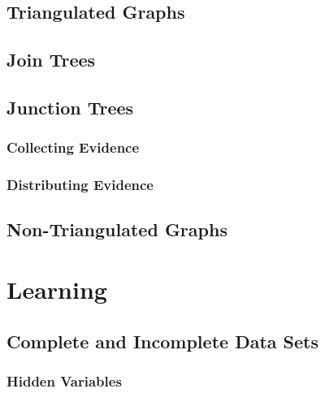     \section{Triangulated Graphs} %

    \section{Join Trees} %

    \section{Junction Trees} %
    	\label{sec:junctionTrees}


        \subsection{Collecting Evidence} %

        \subsection{Distributing Evidence} %

    \section{Non-Triangulated Graphs} %

\chapter{Learning} %

    \section{Complete and Incomplete Data Sets} %

        \subsection{Hidden Variables} %

